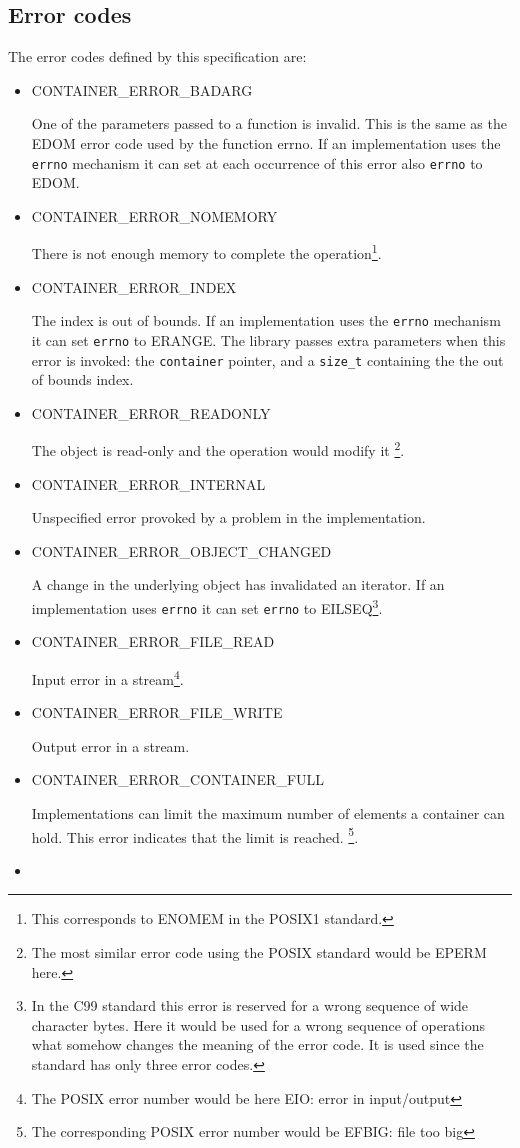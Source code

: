 \documentclass[12pt,a4paper]{memoir} %
\newif\iftth
\newcommand{\doerror}[1]{%
\par\noindent
\iftth
{CONTAINER\_ERROR\_#1}
\else
{\footnotesize CONTAINER\_ERROR\_#1}
\fi
}
\begin{document}
\subsection{Error codes}
\label{errorcodes} 
The error codes defined by this specification are:
\begin{itemize}
\item
\doerror{BADARG} One of the parameters passed to a function is invalid. This is the same as the {\footnotesize EDOM} error code used by the function errno. If an implementation uses the \texttt{errno} mechanism it can set at each occurrence of this error also \texttt{errno} to {\footnotesize EDOM}.
\item
\doerror{NOMEMORY} There is not enough memory to complete the operation\footnote{This corresponds to ENOMEM in the POSIX1 standard.}.
\item
\doerror{INDEX} The index is out of bounds. If an implementation uses the \texttt{errno} mechanism it can set \texttt{errno} to {\footnotesize ERANGE}.
The library passes extra parameters when this error is invoked: the \verb,container, pointer, and a \verb,size_t, containing the
the out of bounds index.
\item
\doerror{READONLY} The object is read-only and the operation would modify it \footnote{The most similar error code using the POSIX standard would be {\footnotesize EPERM} here.}.
\item
\doerror{INTERNAL} Unspecified error provoked by a problem in the implementation.
\item
\doerror{OBJECT\_CHANGED} A change in the underlying object has invalidated an iterator. If an implementation uses \texttt{errno} it can set 
\texttt{errno} to {\footnotesize EILSEQ}\footnote{In the C99 standard this error is reserved for a wrong sequence of wide character bytes. Here it would 
be used for a wrong sequence of operations what somehow changes the meaning of the error code. It is used since the standard has only three error 
codes.}.
\item
\doerror{FILE\_READ} Input error in a stream\footnote{The POSIX error number would be here EIO: error in input/output}.
\item
\doerror{FILE\_WRITE} Output error in a stream.
\item
\doerror{CONTAINER\_FULL} Implementations can limit the maximum number of elements a container can hold. This error indicates that the limit is reached.
\footnote{The corresponding POSIX error number would be EFBIG: file too big}.
\item

\end{itemize}
\end{document}
